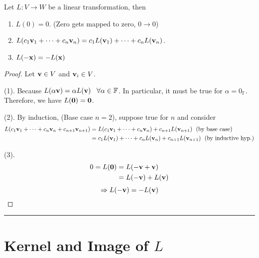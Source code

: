 \begin{theorem}
Let $L: V \to W$ be a linear transformation, then
\begin{enumerate}
	\item $L(0) = 0$.   (Zero gets mapped to zero, $0 \to 0$)
	
	\item $L(c_1 {\bf v}_1 + \cdots + c_n {\bf v}_n) = c_1 L({\bf v}_1) + \cdots +  c_n L({\bf v}_n)$.  
	
	\item $L(-{\bf x}) = -L({\bf x})$
\end{enumerate}


\begin{proof}  Let ${\bf v} \in V$ and ${\bf v}_i \in V$.

	(1). Because $L(\alpha {\bf v}) = \alpha L({\bf v}) \;\;\; \forall \alpha \in \mathbb{F}$.  In particular, it must be true for $\alpha = 0_{\mathbb{F}}$.  Therefore, we have $L({\bf 0}) = {\bf 0}$.
	
	
	
	(2).  By induction, (Base case $n=2$), suppose true for $n$ and consider
	\begin{align*}
	L(c_1 {\bf v}_1 + \cdots + c_n {\bf v}_n + c_{n+1} {\bf v}_{n+1}) &= L(c_1 {\bf v}_1 + \cdots + c_n {\bf v}_n)  + c_{n+1} L({\bf v}_{n+1})   \; \text{ (by base case)} \\
	&=  c_1 L({\bf v}_1) + \cdots +  c_n L({\bf v}_n)+ c_{n+1} L({\bf v}_{n+1})  \;  \text{ (by inductive hyp.)}
	\end{align*}
	  
	
	
	(3).  
	 \begin{align*}
		0 = L({\bf 0}) 	&= L(-{\bf v}+ {\bf v})\\
				&= L(-{\bf v}) + L({\bf v})
	\end{align*}
	\[  \Rightarrow  L(-{\bf v})  = - L({\bf v}) \]
	
	
	
	
\end{proof}
\end{theorem}


\rule[0.01in]{\textwidth}{0.0025in}














\section{Kernel and Image of $L$}


